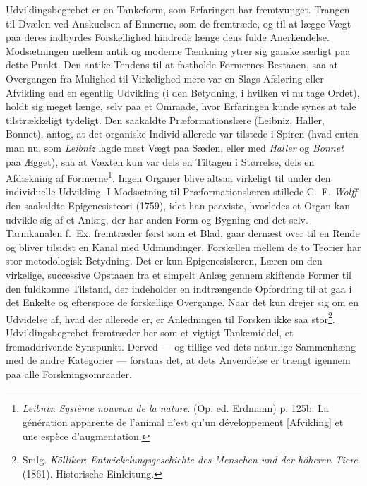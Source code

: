 \documentclass[12pt,a4paper]{book}
\newcommand{\opage}[1]{\marginnote{\footnotesize\textit{[#1]}}}
\begin{document}
Udviklingsbegrebet er en Tankeform, som Erfaringen har fremtvunget. Trangen til
Dvælen ved Anskuelsen af Emnerne, som de fremtræde, og til at lægge Vægt paa deres
indbyrdes Forskellighed hindrede længe dens fulde Anerkendelse. Modsætningen mellem
antik og moderne Tænkning ytrer sig ganske særligt paa dette Punkt. Den antike
Tendens til at fastholde Formernes Bestaaen, saa at Overgangen fra Mulighed til
Virkelighed mere var en Slags Afsløring eller Afvikling end en egentlig Udvikling (i
den Betydning, i hvilken vi nu tage Ordet), holdt sig meget længe, selv paa et
Omraade, hvor Erfaringen kunde synes at tale tilstrækkeligt tydeligt. Den saakaldte
Præformationslære (Leibniz, Haller, Bonnet), antog, at det organiske Individ
allerede var tilstede i Spiren (hvad enten man nu, som \emph{Leibniz} lagde mest
Vægt paa Sæden, eller med \emph{Haller} og \emph{Bonnet} paa Ægget), saa at Væxten
kun var dels en Tiltagen i Størrelse, dels en
\opage{230}Afdækning af
Formerne\footnote{\emph{Leibniz}: \emph{Système nouveau de la nature}. (Op. ed.
Erdmann) p. 125b: La génération apparente de l'animal n'est qu'un développement
[Afvikling] et une espèce d'augmentation.}. Ingen Organer blive altsaa virkeligt til
under den individuelle Udvikling. I Modsætning til Præformationslæren stillede C.\
F. \emph{Wolff} den saakaldte Epigenesisteori (1759), idet han paaviste, hvorledes
et Organ kan udvikle sig af et Anlæg, der har anden Form og Bygning end det selv.
Tarmkanalen f.\ Ex. fremtræder først som et Blad, gaar dernæst over til en Rende og
bliver tilsidst en Kanal med Udmundinger. Forskellen mellem de to Teorier har stor
metodologisk Betydning. Det er kun Epigenesislæren, Læren om den virkelige,
successive Opstaaen fra et simpelt Anlæg gennem skiftende Former til den fuldkomne
Tilstand, der indeholder en indtrængende Opfordring til at gaa i det Enkelte og
efterspore de forskellige Overgange. Naar det kun drejer sig om en Udvidelse af,
hvad der allerede er, er Anledningen til Forsken ikke saa stor\footnote{Smlg.
\emph{Kölliker}: \emph{Entwickelungsgeschichte des Menschen und der höheren Tiere}.
(1861). Historische Einleitung.}. Udviklingsbegrebet fremtræder her som et vigtigt
Tankemiddel, et fremaddrivende Synspunkt. Derved --- og tillige ved dets naturlige
Sammenhæng med de andre Kategorier --- forstaas det, at dets Anvendelse er trængt
igennem paa alle Forskningsomraader.
\end{document}
